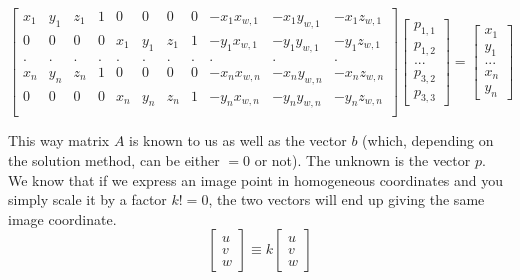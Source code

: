 \documentclass{article}
\begin{document}
\setcounter{MaxMatrixCols}{20}
\begin{equation*}
    \begin{bmatrix}
        x_1 & y_1 & z_1 & 1 & 0 & 0 & 0 & 0 & -x_1 x_{w, 1} & -x_1 y_{w, 1} & -x_1 z_{w, 1} \\
        0 & 0 & 0 & 0 & x_1 & y_1 & z_1 & 1 & -y_1 x_{w, 1} & -y_1 y_{w, 1} & -y_1 z_{w, 1} \\
        . & . & . & . & . & . & . & . & . & . & . \\
        x_n & y_n & z_n & 1 & 0 & 0 & 0 & 0 & -x_n x_{w, n} & -x_n y_{w, n} & -x_n z_{w, n} \\
        0 & 0 & 0 & 0 & x_n & y_n & z_n & 1 & -y_n x_{w, n} & -y_n y_{w, n} & -y_n z_{w, n} \\
    \end{bmatrix}
    \begin{bmatrix}
        p_{1,1} \\
        p_{1,2} \\
        ... \\
        p_{3,2} \\
        p_{3,3}
    \end{bmatrix} = 
    \begin{bmatrix}
        x_1 \\
        y_1 \\
        ... \\
        x_n \\
        y_n
    \end{bmatrix}
\end{equation*}

This way matrix $A$ is known to us as well as the vector $b$ (which, depending on the solution method, can be either $= 0$ or not). The unknown is the vector $p$. \\

We know that if we express an image point in homogeneous coordinates and you simply scale it by a factor $k != 0$, the two vectors will end up giving the same image coordinate.  \\ 

\begin{equation*}
    \begin{bmatrix}
        u \\ v \\ w
    \end{bmatrix} \equiv k
    \begin{bmatrix}
        u \\ v \\ w
    \end{bmatrix}
\end{equation*}
\end{document}
